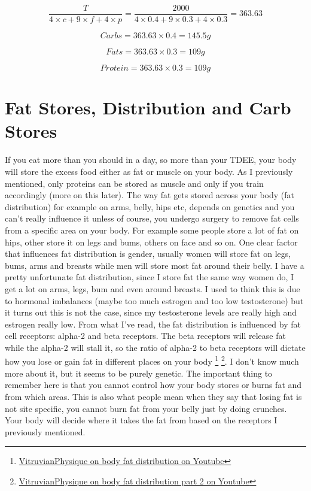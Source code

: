 \documentclass[openany, 12pt]{book}
\begin{document}
	$$ \frac{T}{4 \times c + 9 \times f + 4 \times p} = \frac{2000}{4 \times 0.4 + 9 \times 0.3 + 4 \times 0.3} = 363.63 $$
	
	$$ Carbs = 363.63 \times 0.4 = 145.5g $$
	
	$$ Fats = 363.63 \times 0.3 = 109g $$

	$$ Protein = 363.63 \times 0.3 = 109g $$		
	
	\section{Fat Stores, Distribution and Carb Stores}
	
	If you eat more than you should in a day, so more than your TDEE, your body will store the excess food either as fat or muscle on your body. As I previously mentioned, only
	proteins can be stored as muscle and only if you train accordingly (more on this later). The way fat gets stored across your body (fat distribution) for example on arms, belly,
	hips etc, depends on genetics and you can't really influence it unless of course, you undergo surgery to remove fat cells from a specific area on your body. For example some people
        store a lot of fat on hips, other store it on legs and bums, others on face and so on. One clear factor that influences fat distribution is gender, usually women will store fat on legs,
        bums, arms and breasts while men will store most fat around their belly. I have a pretty unfortunate fat distribution, since I store fat the same way women do, I get a lot on arms,
	legs, bum and even around breasts. I used to think this is due to hormonal imbalances (maybe too much estrogen and too low testosterone) but it turns out this is not the case,
	since my testosterone levels are really high and estrogen really low. From what I've read, the fat distribution is influenced by fat cell receptors: alpha-2 and beta receptors.
	The beta receptors will release fat while the alpha-2 will stall it, so the ratio of alpha-2 to beta receptors will dictate how you lose or gain fat in different places on your body
        \footnote{\href{https://www.youtube.com/watch?v=GbqN2sj8XyY}{VitruvianPhysique on body fat distribution on Youtube}}
        \footnote{\href{https://www.youtube.com/watch?v=X_GeSVbAU3U}{VitruvianPhysique on body fat distribution part 2 on Youtube}}. 
	I don't know much more about it, but it seems to be purely genetic. The important thing to remember here is that you cannot control how your body stores or burns fat and from
	which areas. This is also what people mean when they say that losing fat is not site specific, you cannot burn fat from your belly just by doing crunches. Your body will decide
	where it takes the fat from based on the receptors I previously mentioned.
	
\end{document}
